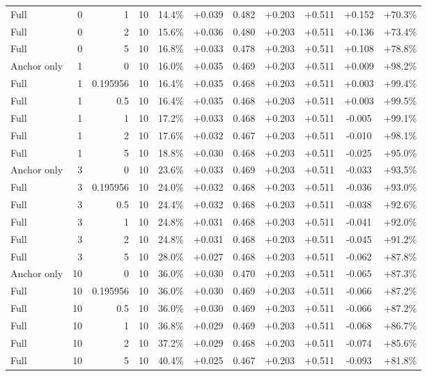 \begin{table}[htbp]
\begin{tabular}{lrrrccccccc}
Full & 0 & 1 & 10 & 14.4\% & +0.039 & 0.482 & +0.203 & +0.511 & +0.152 & +70.3\% \\
Full & 0 & 2 & 10 & 15.6\% & +0.036 & 0.480 & +0.203 & +0.511 & +0.136 & +73.4\% \\
Full & 0 & 5 & 10 & 16.8\% & +0.033 & 0.478 & +0.203 & +0.511 & +0.108 & +78.8\% \\
Anchor only & 1 & 0 & 10 & 16.0\% & +0.035 & 0.469 & +0.203 & +0.511 & +0.009 & +98.2\% \\
Full & 1 & 0.195956 & 10 & 16.4\% & +0.035 & 0.468 & +0.203 & +0.511 & +0.003 & +99.4\% \\
Full & 1 & 0.5 & 10 & 16.4\% & +0.035 & 0.468 & +0.203 & +0.511 & +0.003 & +99.5\% \\
Full & 1 & 1 & 10 & 17.2\% & +0.033 & 0.468 & +0.203 & +0.511 & -0.005 & +99.1\% \\
Full & 1 & 2 & 10 & 17.6\% & +0.032 & 0.467 & +0.203 & +0.511 & -0.010 & +98.1\% \\
Full & 1 & 5 & 10 & 18.8\% & +0.030 & 0.468 & +0.203 & +0.511 & -0.025 & +95.0\% \\
Anchor only & 3 & 0 & 10 & 23.6\% & +0.033 & 0.469 & +0.203 & +0.511 & -0.033 & +93.5\% \\
Full & 3 & 0.195956 & 10 & 24.0\% & +0.032 & 0.468 & +0.203 & +0.511 & -0.036 & +93.0\% \\
Full & 3 & 0.5 & 10 & 24.4\% & +0.032 & 0.468 & +0.203 & +0.511 & -0.038 & +92.6\% \\
Full & 3 & 1 & 10 & 24.8\% & +0.031 & 0.468 & +0.203 & +0.511 & -0.041 & +92.0\% \\
Full & 3 & 2 & 10 & 24.8\% & +0.031 & 0.468 & +0.203 & +0.511 & -0.045 & +91.2\% \\
Full & 3 & 5 & 10 & 28.0\% & +0.027 & 0.468 & +0.203 & +0.511 & -0.062 & +87.8\% \\
Anchor only & 10 & 0 & 10 & 36.0\% & +0.030 & 0.470 & +0.203 & +0.511 & -0.065 & +87.3\% \\
Full & 10 & 0.195956 & 10 & 36.0\% & +0.030 & 0.469 & +0.203 & +0.511 & -0.066 & +87.2\% \\
Full & 10 & 0.5 & 10 & 36.0\% & +0.030 & 0.469 & +0.203 & +0.511 & -0.066 & +87.2\% \\
Full & 10 & 1 & 10 & 36.8\% & +0.029 & 0.469 & +0.203 & +0.511 & -0.068 & +86.7\% \\
Full & 10 & 2 & 10 & 37.2\% & +0.029 & 0.468 & +0.203 & +0.511 & -0.074 & +85.6\% \\
Full & 10 & 5 & 10 & 40.4\% & +0.025 & 0.467 & +0.203 & +0.511 & -0.093 & +81.8\% \\

\end{tabular}
\end{table}
